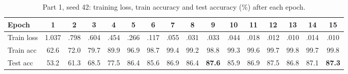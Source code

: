 \documentclass[11pt]{article}
\begin{document}
\begin{table}[H]
\centering
\footnotesize
\setlength{\tabcolsep}{3.2pt}
\caption{Part 1, seed 42: training loss, train accuracy and test accuracy (\%) after each epoch.}
\label{tab:p1}
\begin{tabular}{@{}l *{15}{c}@{}}
\toprule
Epoch & 1 & 2 & 3 & 4 & 5 & 6 & 7 & 8 & 9 & 10 & 11 & 12 & 13 & 14 & 15 \\
\midrule
Train loss & 1.037 & .798 & .604 & .454 & .266 & .117 & .055 & .031 & .033 & .044 & .018 & .012 & .010 & .014 & .010 \\
Train acc  & 62.6 & 72.0 & 79.7 & 89.9 & 96.9 & 98.7 & 99.4 & 99.2 & 98.8 & 99.3 & 99.6 & 99.7 & 99.8 & 99.7 & 99.8 \\
Test acc   & 53.2 & 61.3 & 68.5 & 77.5 & 86.4 & 85.6 & 86.9 & 86.4 & \textbf{87.6} & 85.9 & 86.9 & 87.5 & 86.8 & 87.1 & \textbf{87.3} \\
\bottomrule
\end{tabular}
\end{table}
\end{document}
